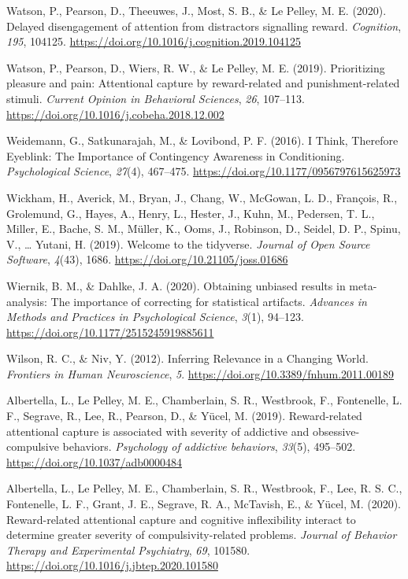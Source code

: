 \documentclass[
  man,
  floatsintext,
  longtable,
  nolmodern,
  notxfonts,
  notimes,
  mask,
  colorlinks=true,linkcolor=blue,citecolor=blue,urlcolor=blue]{apa7}
\newlength{\cslhangindent}
\newenvironment{CSLReferences}[2] %
 {\begin{list}{}{%
  \setlength{\itemindent}{0pt}
  \setlength{\leftmargin}{0pt}
  \setlength{\parsep}{0pt}
  \ifodd #1
   \setlength{\leftmargin}{\cslhangindent}
   \setlength{\itemindent}{-1\cslhangindent}
  \fi
  \setlength{\itemsep}{#2\baselineskip}}}
 {\end{list}}
\begin{document}
\begin{CSLReferences}{1}{0}
Watson, P., Pearson, D., Theeuwes, J., Most, S. B., \& Le Pelley, M. E.
(2020). Delayed disengagement of attention from distractors signalling
reward. \emph{Cognition}, \emph{195}, 104125.
\url{https://doi.org/10.1016/j.cognition.2019.104125}

Watson, P., Pearson, D., Wiers, R. W., \& Le Pelley, M. E. (2019).
Prioritizing pleasure and pain: Attentional capture by reward-related
and punishment-related stimuli. \emph{Current Opinion in Behavioral
Sciences}, \emph{26}, 107--113.
\url{https://doi.org/10.1016/j.cobeha.2018.12.002}

Weidemann, G., Satkunarajah, M., \& Lovibond, P. F. (2016). I Think,
Therefore Eyeblink: The Importance of Contingency Awareness in
Conditioning. \emph{Psychological Science}, \emph{27}(4), 467--475.
\url{https://doi.org/10.1177/0956797615625973}

Wickham, H., Averick, M., Bryan, J., Chang, W., McGowan, L. D.,
François, R., Grolemund, G., Hayes, A., Henry, L., Hester, J., Kuhn, M.,
Pedersen, T. L., Miller, E., Bache, S. M., Müller, K., Ooms, J.,
Robinson, D., Seidel, D. P., Spinu, V., \ldots{} Yutani, H. (2019).
Welcome to the {tidyverse}. \emph{Journal of Open Source Software},
\emph{4}(43), 1686. \url{https://doi.org/10.21105/joss.01686}

Wiernik, B. M., \& Dahlke, J. A. (2020). Obtaining unbiased results in
meta-analysis: The importance of correcting for statistical artifacts.
\emph{Advances in Methods and Practices in Psychological Science},
\emph{3}(1), 94--123. \url{https://doi.org/10.1177/2515245919885611}

Wilson, R. C., \& Niv, Y. (2012). Inferring {Relevance} in a {Changing
World}. \emph{Frontiers in Human Neuroscience}, \emph{5}.
\url{https://doi.org/10.3389/fnhum.2011.00189}

Albertella, L., Le Pelley, M. E., Chamberlain, S. R., Westbrook, F.,
Fontenelle, L. F., Segrave, R., Lee, R., Pearson, D., \& Yücel, M.
(2019). Reward-related attentional capture is associated with severity
of addictive and obsessive-compulsive behaviors. \emph{Psychology of
addictive behaviors}, \emph{33}(5), 495--502.
\url{https://doi.org/10.1037/adb0000484}

Albertella, L., Le Pelley, M. E., Chamberlain, S. R., Westbrook, F.,
Lee, R. S. C., Fontenelle, L. F., Grant, J. E., Segrave, R. A.,
McTavish, E., \& Yücel, M. (2020). Reward-related attentional capture
and cognitive inflexibility interact to determine greater severity of
compulsivity-related problems. \emph{Journal of Behavior Therapy and
Experimental Psychiatry}, \emph{69}, 101580.
\url{https://doi.org/10.1016/j.jbtep.2020.101580}


\end{CSLReferences}
\end{document}
